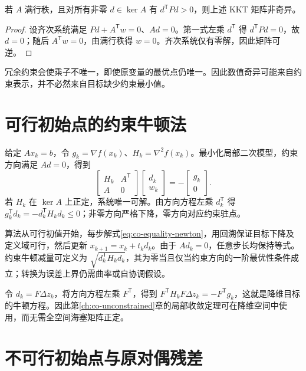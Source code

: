 \begin{proposition}
若 $A$ 满行秩，且对所有非零 $d\in\ker A$ 有 $d^{\mathsf T}Pd>0$，则上述 KKT 矩阵非奇异。
\end{proposition}
\begin{proof}
设齐次系统满足 $Pd+A^{\mathsf T}w=0$、$Ad=0$。第一式左乘 $d^{\mathsf T}$ 得 $d^{\mathsf T}Pd=0$，故 $d=0$；随后 $A^{\mathsf T}w=0$，由满行秩得 $w=0$。齐次系统仅有零解，因此矩阵可逆。
\end{proof}
冗余约束会使乘子不唯一，即使原变量的最优点仍唯一。因此数值奇异可能来自约束表示，并不必然来自目标缺少约束最小值。

\section{可行初始点的约束牛顿法}

给定 $Ax_k=b$，令 $g_k=\nabla f(x_k)$、$H_k=\nabla^2f(x_k)$。最小化局部二次模型，约束方向满足 $Ad=0$，得到
\begin{equation}
 \begin{bmatrix}H_k&A^{\mathsf T}\\A&0\end{bmatrix}
 \begin{bmatrix}d_k\\w_k\end{bmatrix}
 =-\begin{bmatrix}g_k\\0\end{bmatrix}.
 \label{eq:co-equality-newton}
\end{equation}
若 $H_k$ 在 $\ker A$ 上正定，系统唯一可解。由方向方程左乘 $d_k^{\mathsf T}$ 得 $g_k^{\mathsf T}d_k=-d_k^{\mathsf T}H_kd_k\leq0$；非零方向严格下降，零方向对应约束驻点。

算法从可行初值开始，每步解式\eqref{eq:co-equality-newton}，用回溯保证目标下降及定义域可行，然后更新 $x_{k+1}=x_k+t_kd_k$。由于 $Ad_k=0$，任意步长均保持等式。约束牛顿减量可定义为 $\sqrt{d_k^{\mathsf T}H_kd_k}$，其为零当且仅当约束方向的一阶最优性条件成立；转换为误差上界仍需曲率或自协调假设。

令 $d_k=F\Delta z_k$，将方向方程左乘 $F^{\mathsf T}$，得到 $F^{\mathsf T}H_kF\Delta z_k=-F^{\mathsf T}g_k$，这就是降维目标的牛顿方程。因此第\ref{ch:co-unconstrained}章的局部收敛定理可在降维空间中使用，而无需全空间海塞矩阵正定。

\section{不可行初始点与原对偶残差}

